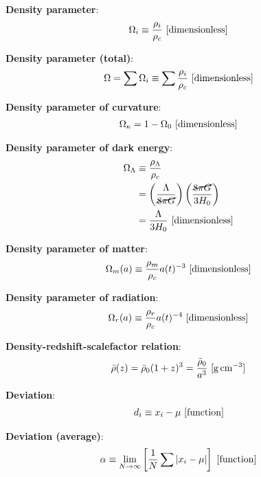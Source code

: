 \documentclass[a4paper,10pt]{article}
\begin{document}
{\noindent}\textbf{Density parameter}:
\begin{align*}
    \Omega_i \equiv \frac{\rho_i}{\rho_c} ~ [{\rm dimensionless}]
\end{align*}

{\noindent}\textbf{Density parameter (total)}:
\begin{align*}
    \Omega = \sum\Omega_i \equiv \sum \frac{\rho_i}{\rho_c} ~ [{\rm dimensionless}]
\end{align*}

{\noindent}\textbf{Density parameter of curvature}:
\begin{align*}
    \Omega_\kappa = 1-\Omega_0 ~ [{\rm dimensionless}]
\end{align*}

{\noindent}\textbf{Density parameter of dark energy}:
\begin{align*}
    \Omega_\Lambda &\equiv \dfrac{\rho_\Lambda}{\rho_c} \\
    &= \left(\dfrac{\Lambda}{\cancel{8\pi G}}\right) \left(\dfrac{\cancel{8\pi G}}{3H_0}\right) \\
    &= \dfrac{\Lambda}{3H_0} ~ [{\rm dimensionless}]
\end{align*}

{\noindent}\textbf{Density parameter of matter}:
\begin{align*}
    \Omega_m(a) \equiv \dfrac{\rho_m}{\rho_c}a(t)^{-3} ~ [{\rm dimensionless}]
\end{align*}

{\noindent}\textbf{Density parameter of radiation}:
\begin{align*}
    \Omega_r(a) \equiv \dfrac{\rho_r}{\rho_c}a(t)^{-4} ~ [{\rm dimensionless}]
\end{align*}

{\noindent}\textbf{Density-redshift-scalefactor relation}:
\begin{align*}
    \bar{\rho}(z) = \bar{\rho}_0(1+z)^3 = \frac{\bar{\rho}_0}{a^3} ~ [{\rm g\,cm^{-3}}]
\end{align*}

{\noindent}\textbf{Deviation}:
\begin{align*}
    d_i \equiv x_i - \mu ~ [{\rm function}]
\end{align*}

{\noindent}\textbf{Deviation (average)}:
\begin{align*}
    \alpha \equiv \lim_{N\rightarrow\infty}\left[ \frac{1}{N} \sum \left\lvert x_i-\mu\right\rvert \right] ~ [{\rm function}]
\end{align*}
\end{document}

